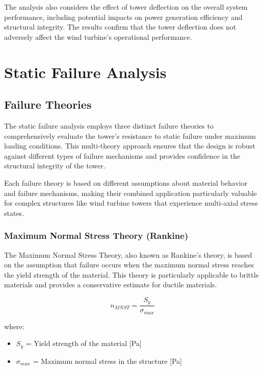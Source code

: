 \documentclass[12pt]{article}
\begin{document}
The analysis also considers the effect of tower deflection on the overall system performance, including potential impacts on power generation efficiency and structural integrity. The results confirm that the tower deflection does not adversely affect the wind turbine's operational performance.

\section{Static Failure Analysis}

\subsection{Failure Theories}

The static failure analysis employs three distinct failure theories to comprehensively evaluate the tower's resistance to static failure under maximum loading conditions. This multi-theory approach ensures that the design is robust against different types of failure mechanisms and provides confidence in the structural integrity of the tower.

Each failure theory is based on different assumptions about material behavior and failure mechanisms, making their combined application particularly valuable for complex structures like wind turbine towers that experience multi-axial stress states.

\subsubsection{Maximum Normal Stress Theory (Rankine)}

The Maximum Normal Stress Theory, also known as Rankine's theory, is based on the assumption that failure occurs when the maximum normal stress reaches the yield strength of the material. This theory is particularly applicable to brittle materials and provides a conservative estimate for ductile materials.

\begin{equation}
n_{MNST} = \frac{S_y}{\sigma_{max}}
\end{equation}

where:
\begin{itemize}
    \item $S_y$ = Yield strength of the material [Pa]
    \item $\sigma_{max}$ = Maximum normal stress in the structure [Pa]
\end{itemize}
\end{document}
